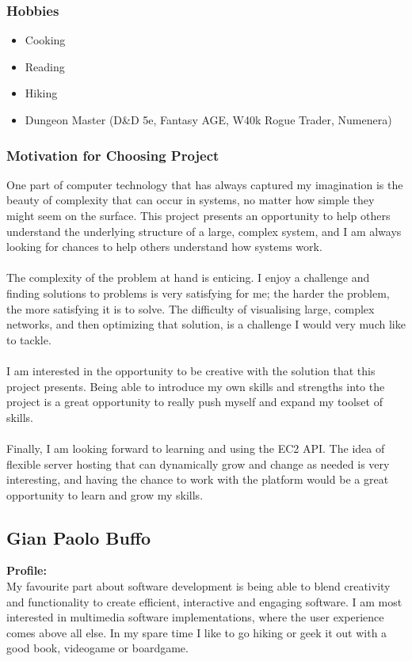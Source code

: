 \documentclass{article}
\begin{document}
		\subsubsection{Hobbies}
			\begin{itemize}
				\item Cooking
				\item Reading
				\item Hiking
				\item Dungeon Master (D\&D 5e, Fantasy AGE, W40k Rogue Trader, Numenera)
			\end{itemize}
		\subsubsection{Motivation for Choosing Project}
			One part of computer technology that has always captured my imagination is the beauty of complexity that can occur in systems, no matter how simple they might seem on the surface. This project presents an opportunity to help others understand the underlying structure of a large, complex system, and I am always looking for chances to help others understand how systems work.
\\\\		
			The complexity of the problem at hand is enticing. I enjoy a challenge and finding solutions to problems is very satisfying for me; the harder the problem, the more satisfying it is to solve. The difficulty of visualising large, complex networks, and then optimizing that solution, is a challenge I would very much like to tackle.
\\\\			
			I am interested in the opportunity to be creative with the solution that this project presents. Being able to introduce my own skills and strengths into the project is a great opportunity to really push myself and expand my toolset of skills.
\\\\			
			Finally, I am looking forward to learning and using the EC2 API. The idea of flexible server hosting that can dynamically grow and change as needed is very interesting, and having the chance to work with the platform would be a great opportunity to learn and grow my skills.
		
	\cleardoublepage	
	
	\subsection{Gian Paolo Buffo}
	\textbf{Profile:}\\
	My favourite part about software development is being able to blend creativity and functionality to create efficient, interactive and engaging software. I am most interested in multimedia software implementations, where the user experience comes above all else. In my spare time I like to go hiking or geek it out with a good book, videogame or boardgame.  
\end{document}
